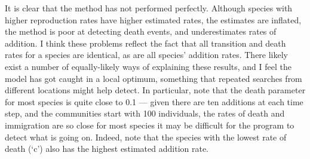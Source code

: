 \documentclass[12pt]{amsart}
\begin{document}
It is clear that the method has not performed perfectly. Although species with higher reproduction rates have higher estimated rates, the estimates are inflated, the method is poor at detecting death events, and underestimates rates of addition. I think these problems reflect the fact that all transition and death rates for a species are identical, as are all species' addition rates. There likely exist a number of equally-likely ways of explaining these results, and I feel the model has got caught in a local optimum, something that repeated searches from different locations might help detect. In particular, note that the death parameter for most species is quite close to 0.1 --- given there are ten additions at each time step, and the communities start with 100 individuals, the rates of death and immigration are so close for most species it may be difficult for the program to detect what is going on. Indeed, note that the species with the lowest rate of death (`c') also has the highest estimated addition rate.
\end{document}
